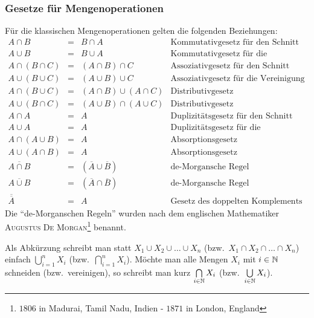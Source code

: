 \subsubsection{Gesetze für Mengenoperationen}
\label{SetOpSect}
Für die klassischen Mengenoperationen gelten die folgenden Beziehungen:
\begin{displaymath}
\begin{array}{rcll}
A \cap B &=& B \cap A & \text{Kommutativgesetz für den Schnitt}\\
A \cup B &=& B \cup A & \text{Kommutativgesetz für die Vereinigung}\\
A \cap (B \cap C) &=& (A \cap B) \cap C & \text{Assoziativgesetz für
den Schnitt}\\
A \cup (B \cup C) &=& (A \cup B) \cup C & \text{Assoziativgesetz für
die Vereinigung}\\
A \cap (B \cup C) &=& (A \cap B) \cup (A \cap C) & \text{Distributivgesetz}\\
A \cup (B \cap C) &=& (A \cup B) \cap (A \cup C) & \text{Distributivgesetz}\\
A \cap A &=& A & \text{Duplizitätsgesetz für den Schnitt}\\
A \cup A &=& A & \text{Duplizitätsgesetz für die Vereinigung}\\
A \cap (A \cup B) &=& A & \text{Absorptionsgesetz}\\
A \cup (A \cap B) &=& A & \text{Absorptionsgesetz}\\
\overline{A \cap B} &=& (\overline{A} \cup \overline{B}) &
\text{de-Morgansche Regel}\\
\overline{A \cup B} &=& (\overline{A} \cap \overline{B}) &
\text{de-Morgansche Regel}\\
\overline{\overline{A}} &=& A & \text{Gesetz des doppelten Komplements}
\end{array}
\end{displaymath}
Die "`de-Morganschen Regeln"' wurden nach dem englischen
Mathematiker \textsc{Augustus De Morgan}\footnote{\textborn $1806$ in
Madurai, Tamil Nadu, Indien - \textdied $1871$ in London, England}
benannt.

Als Abkürzung schreibt man statt $X_1 \cup X_2 \cup \dots \cup X_n$
(bzw.~$X_1 \cap X_2 \cap \dots \cap X_n$) einfach $\bigcup\limits_{i=1}^n X_i$
(bzw.~$\bigcap\limits_{i=1}^n X_i$). Möchte man alle Mengen $X_i$ mit
$i \in \mathbb N$ schneiden (bzw.~vereinigen), so schreibt man kurz
$\bigcap\limits_{i \in \mathbb N} X_i$ (bzw.~$\bigcup\limits_{i \in \mathbb N} X_i$).

